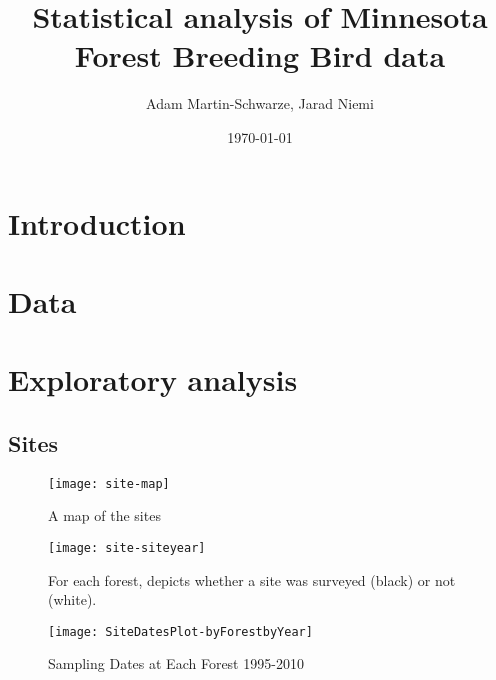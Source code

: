 \documentclass{article}
\title{Statistical analysis of Minnesota Forest Breeding Bird data}
\author{Adam Martin-Schwarze, Jarad Niemi}
\date{\today}
\begin{document}
\maketitle
\tableofcontents
\newpage


\section{Introduction}



\section{Data} 



\section{Exploratory analysis}

\subsection{Sites}






\begin{figure}
\texttt{[image: site-map]}
\caption{A map of the sites}
\label{fig:site-map}
\end{figure}


\begin{figure}
\texttt{[image: site-siteyear]}
\caption{For each forest, depicts whether a site was surveyed (black) or not (white).}
\label{fig:site-siteyear}
\end{figure}


\begin{figure}
\texttt{[image: SiteDatesPlot-byForestbyYear]}
\caption{Sampling Dates at Each Forest 1995-2010}
\label{fig:SiteDatesPlot-byForestbyYear}
\end{figure}
\end{document}

